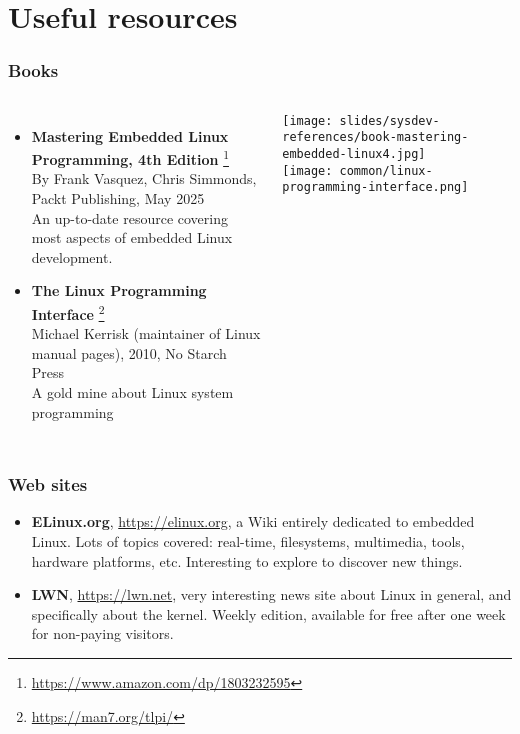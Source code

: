 \section{Useful resources}

\begin{frame}
  \frametitle{Books}
  \begin{columns}
    \small
    \begin{itemize}
    \item {\bf Mastering Embedded Linux Programming, 4th Edition}
      \footnote{\tiny
\url{https://www.amazon.com/dp/1803232595}}\\
      By Frank Vasquez, Chris Simmonds, Packt Publishing, May 2025\\
      An up-to-date resource covering most aspects of embedded Linux
      development.
    \item {\bf The Linux Programming Interface}
      \footnote{\tiny \url{https://man7.org/tlpi/}}\\
      Michael Kerrisk (maintainer of Linux manual pages), 2010, No Starch Press\\
      A gold mine about Linux system programming\\
    \end{itemize}
    \normalsize
    \texttt{[image: slides/sysdev-references/book-mastering-embedded-linux4.jpg]}\\
    \vspace{0.5cm}
    \texttt{[image: common/linux-programming-interface.png]}\\
  \end{columns}
\end{frame}

\begin{frame}
  \frametitle{Web sites}
  \begin{itemize}
  \item {\bf ELinux.org}, \url{https://elinux.org}, a Wiki entirely
    dedicated to embedded Linux. Lots of topics covered: real-time,
    filesystems, multimedia, tools, hardware platforms,
    etc. Interesting to explore to discover new things.
  \item {\bf LWN}, \url{https://lwn.net}, very interesting news site
    about Linux in general, and specifically about the kernel. Weekly
    edition, available for free after one week for non-paying
    visitors.
  \end{itemize}
\end{frame}

